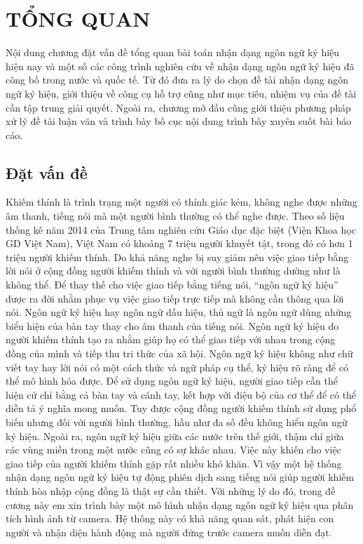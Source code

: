 \chapter{TỔNG QUAN}
\label{s:tong_quan}
Nội dung chương đặt vấn đề tổng quan bài toán nhận dạng ngôn ngữ ký hiệu hiện nay và một số các công trình nghiên cứu về nhận dạng ngôn ngữ ký hiệu đã công bố trong nước và quốc tế. Từ đó đưa ra lý do chọn đề tài nhận dạng ngôn ngữ ký hiệu, giới thiệu về công cụ hỗ trợ cũng như mục tiêu, nhiệm vụ của đề tài cần tập trung giải quyết. Ngoài ra, chương mở đầu cũng giới thiệu phương pháp xử lý đề tài luận văn và trình bày bố cục nội dung trình bày xuyên suốt bài báo cáo.

\section{Đặt vấn đề}
Khiếm thính là trình trạng một người có thính giác kém, không nghe được những âm thanh, tiếng nói mà một người bình thường có thể nghe được. Theo số liệu thống kê năm 2014 của Trung tâm nghiên cứu Giáo dục đặc biệt (Viện Khoa học GD Việt Nam), Việt Nam có khoảng 7 triệu người khuyết tật, trong đó có hơn 1 triệu người khiếm thính. Do khả năng nghe bị suy giảm nên việc giao tiếp bằng lời nói ở cộng đồng người khiếm thính  và với người bình thường dường như là không thể. Để thay thế cho việc giao tiếp bằng tiếng nói, “ngôn ngữ ký hiệu” được ra đời nhằm phục vụ việc giao tiếp trực tiếp mà không cần thông qua lời nói.
Ngôn ngữ ký hiệu hay ngôn ngữ dấu hiệu, thủ ngữ là ngôn ngữ dùng những biểu hiện của bàn tay thay cho âm thanh của tiếng nói. Ngôn ngữ ký hiệu do người khiếm thính tạo ra nhằm giúp họ có thể giao tiếp với nhau trong cộng đồng của mình và tiếp thu tri thức của xã hội. Ngôn ngữ ký hiệu không như chữ viết tay hay lời nói có một cách thức và ngữ pháp cụ thể, ký hiệu rõ ràng để có thể mô hình hóa được. Để sử dụng ngôn ngữ ký hiệu, người giao tiếp cần thể hiện cử chỉ bằng cả bàn tay và cánh tay, kết hợp với điệu bộ của cơ thể để có thể diễn tả ý nghĩa mong muốn. Tuy được cộng đồng người khiếm thính sử dụng phổ biến nhưng đối với người bình thường, hầu như đa số đều không hiểu ngôn ngữ ký hiệu. Ngoài ra, ngôn ngữ ký hiệu giữa các nước trên thế giới, thậm chí giữa các vùng miền trong một nước cũng có sự khác nhau. Việc này khiến cho việc giao tiếp của người khiếm thính gặp rất nhiều khó khăn. Vì vậy một hệ thống nhận dạng ngôn ngữ ký hiệu tự động phiên dịch sang tiếng nói giúp người khiếm thính hòa nhập cộng đồng là thật sự cần thiết.
Với những lý do đó, trong đề cương này em xin trình bày một mô hình nhận dạng ngôn ngữ ký hiệu qua phân tích hình ảnh từ camera. Hệ thống này có khả năng quan sát, phát hiện con người và nhận diện hành động mà người đứng trước camera muốn diễn đạt. 

